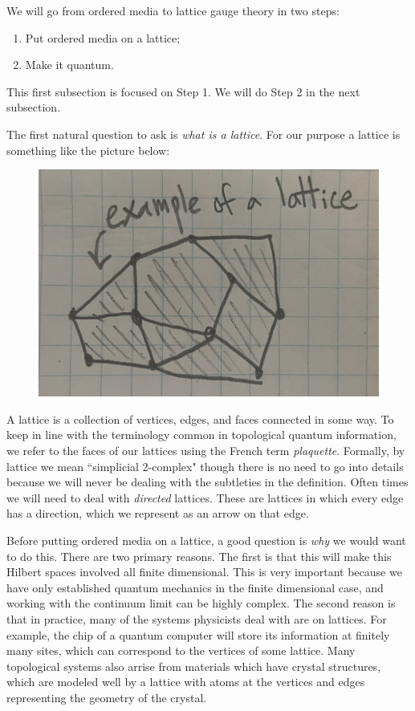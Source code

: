 \documentclass{article}
\theoremstyle{definition}
\newcommand{\0}{\left|0\right>}
\newcommand{\1}{\left|1\right>}
\numberwithin{figure}{section}
\begin{document}
We will go from ordered media to lattice gauge theory in two steps:

\begin{enumerate}[Step 1:]
\item Put ordered media on a lattice;
\item Make it quantum.
\end{enumerate}

This first subsection is focused on Step 1. We will do Step 2 in the next subsection.

The first natural question to ask is \textit{what is a lattice}. For our purpose a lattice is something like the picture below:

\begin{figure}[h]
\begin{center}
\includegraphics[scale=.04]{lattice-example}
\end{center}
\end{figure}

A lattice is a collection of vertices, edges, and faces connected in some way. To keep in line with the terminology common in topological quantum information, we refer to the faces of our lattices using the French term \textit{plaquette}. Formally, by lattice we mean ``simplicial 2-complex" though there is no need to go into details because we will never be dealing with the subtleties in the definition. Often times we will need to deal with \textit{directed} lattices. These are lattices in which every edge has a direction, which we represent as an arrow on that edge.

Before putting ordered media on a lattice, a good question is \textit{why} we would want to do this. There are two primary reasons. The first is that this will make this Hilbert spaces involved all finite dimensional. This is very important because we have only established quantum mechanics in the finite dimensional case, and working with the continuum limit can be highly complex. The second reason is that in practice, many of the systems physicists deal with are on lattices. For example, the chip of a quantum computer will store its information at finitely many sites, which can correspond to the vertices of some lattice. Many topological systems also arrise from materials which have crystal structures, which are modeled well by a lattice with atoms at the vertices and edges representing the geometry of the crystal.
\end{document}
